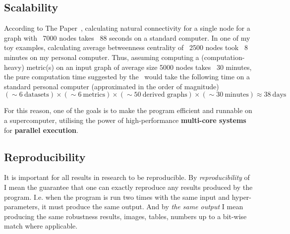 \subsection{Scalability}

According to The Paper~\cite{Bozhilova2019}, calculating natural connectivity for a single node for a graph with ~7000 nodes takes ~88 seconds on a standard computer.
In one of my toy examples, calculating average betweenness centrality of ~2500 nodes took ~8 minutes on my personal computer.
Thus, assuming computing a (computation-heavy) metric(s) on an input graph of average size 5000 nodes takes ~30 minutes, the pure computation time suggested by the~ would take the following time on a standard personal computer (approximated in the order of magnitude)
\[(\sim 6\ \text{datasets}) \times (\sim 6\ \text{metrics}) \times (\sim 50\ \text{derived graphs}) \times (\sim 30\ \text{minutes}) \approx 38\ \text{days}\]

For this reason, one of the goals is to make the program efficient and runnable on a supercomputer, utilising the power of high-performance \textbf{multi-core systems} for \textbf{parallel execution}.

\subsection{Reproducibility}\label{sec:reproducibility}

It is important for all results in research to be reproducible.
By \textsl{reproducibility} of \graffs I mean the guarantee that one can exactly reproduce any results produced by the program.
I.e. when the program is run two times with the same input and hyper-parameters, it must produce the same output.
And by \textsl{the same output} I mean producing the same robustness results, images, tables, numbers up to a bit-wise match where applicable.


